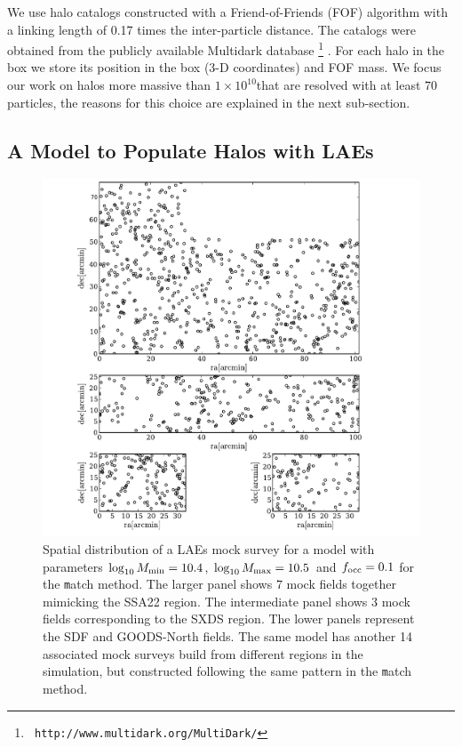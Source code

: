 \documentclass[usenatbib]{mn2e}
\newcommand{\hMsun}{{\ifmmode{h^{-1}{\rm
        {M_{\odot}}}}\else{$h^{-1}{\rm{M_{\odot}}}$}\fi}}
\begin{document}
We use halo catalogs constructed with a Friend-of-Friends (FOF)
algorithm with a linking length of 0.17 times the inter-particle
distance. The catalogs were obtained from the publicly available
Multidark database \footnote{{\tt
    http://www.multidark.org/MultiDark/}}
\citep{MultiDark}. For each halo in the box we store its
position in the box (3-D coordinates) and FOF mass. We focus our work
on halos more massive than $1\times 10^{10}$\hMsun that are resolved
with at least $70$ particles, the reasons for this choice are
explained in the next sub-section.  


\subsection{A Model to Populate Halos with LAEs}
\label{subsec:mocks}



\begin{figure}
\begin{center}
\includegraphics[width=0.8\linewidth,angle=0]{./plots/Figure0.pdf}
\caption{ \label{fig:distros} Spatial distribution of a LAEs mock
  survey for a model with parameters $\log_{10}M_{\rm min}=10.4$, $\log_{10}M_{\rm
    max}=10.5$ and $f_{\rm occ}=0.1$ for the {\texttt match}
  method. The larger panel shows $7$ mock
  fields together mimicking the SSA22 region. The intermediate panel
  shows $3$ mock fields corresponding to the SXDS region. The lower
  panels represent the SDF and GOODS-North fields. The same model has
  another 14 associated mock surveys build from different regions in
  the simulation, but constructed following the same pattern in the
  {\texttt match} method.}
\end{center} 
\end{figure}
\end{document}
